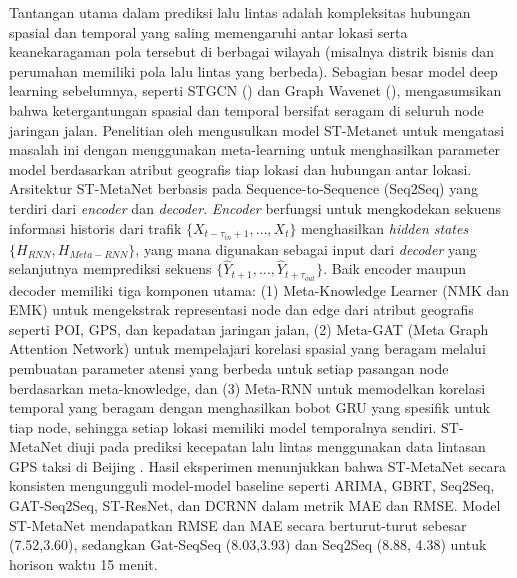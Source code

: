 Tantangan utama dalam prediksi lalu lintas adalah kompleksitas hubungan spasial dan temporal yang saling memengaruhi antar lokasi serta keanekaragaman pola tersebut di berbagai wilayah (misalnya distrik bisnis dan perumahan memiliki pola lalu lintas yang berbeda). Sebagian besar model deep learning sebelumnya, seperti STGCN (\cite{Yu2018}) dan Graph Wavenet (\cite{Wu2019}), mengasumsikan bahwa ketergantungan spasial dan temporal bersifat seragam di seluruh node jaringan jalan. Penelitian oleh \cite{Pan2019} mengusulkan model ST-Metanet untuk mengatasi masalah ini dengan menggunakan meta-learning untuk menghasilkan parameter model berdasarkan atribut geografis tiap lokasi dan hubungan antar lokasi. Arsitektur ST-MetaNet berbasis pada Sequence-to-Sequence (Seq2Seq) yang terdiri dari \textit{encoder} dan \textit{decoder}. \textit{Encoder} berfungsi untuk mengkodekan sekuens informasi historis dari trafik $\{X_{t-\tau_{in}+1},\ldots,X_t\}$ menghasilkan \textit{hidden states} $\{H_{RNN}, H_{Meta-RNN}\}$, yang mana digunakan sebagai input dari \textit{decoder} yang selanjutnya memprediksi sekuens $\{\hat{Y}_{t+1},\ldots, \hat{Y}_{t+\tau_{out}}\}$. Baik encoder maupun decoder memiliki tiga komponen utama: (1) Meta-Knowledge Learner (NMK dan EMK) untuk mengekstrak representasi node dan edge dari atribut geografis seperti POI, GPS, dan kepadatan jaringan jalan, (2) Meta-GAT (Meta Graph Attention Network) untuk mempelajari korelasi spasial yang beragam melalui pembuatan parameter atensi yang berbeda untuk setiap pasangan node berdasarkan meta-knowledge, dan (3) Meta-RNN untuk memodelkan korelasi temporal yang beragam dengan menghasilkan bobot GRU yang spesifik untuk tiap node, sehingga setiap lokasi memiliki model temporalnya sendiri. ST-MetaNet diuji pada prediksi kecepatan lalu lintas menggunakan data lintasan GPS taksi di Beijing . Hasil eksperimen menunjukkan bahwa ST-MetaNet secara konsisten mengungguli model-model baseline seperti ARIMA, GBRT, Seq2Seq, GAT-Seq2Seq, ST-ResNet, dan DCRNN dalam metrik MAE dan RMSE. Model ST-MetaNet mendapatkan RMSE dan MAE secara berturut-turut sebesar (7.52,3.60), sedangkan Gat-SeqSeq (8.03,3.93) dan Seq2Seq (8.88, 4.38) untuk horison waktu 15 menit.

